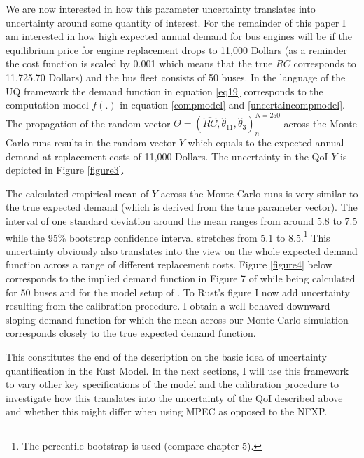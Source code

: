 We are now interested in how this parameter uncertainty translates into uncertainty around some quantity of interest. For the remainder of this paper I am interested in how high expected annual demand for bus engines will be if the equilibrium price for engine replacement drops to 11,000 Dollars (as a reminder the cost function is scaled by 0.001 which means that the true $RC$ corresponds to 11,725.70 Dollars) and the bus fleet consists of 50 buses. In the language of the UQ framework the demand function in equation \ref{eq19} corresponds to the computation model $f(.)$ in equation \ref{compmodel} and \ref{uncertaincompmodel}. The propagation of the random vector $\Theta = (\hat{RC}, \hat\theta_{11}, \hat\theta_3)^{N=250}_n$ across the Monte Carlo runs results in the random vector $Y$ which equals to the expected annual demand at replacement costs of 11,000 Dollars. The uncertainty in the QoI $Y$ is depicted in Figure \ref{figure3}.


The calculated empirical mean of $Y$ across the Monte Carlo runs is very similar to the true expected demand (which is derived from the true parameter vector). The interval of one standard deviation around the mean ranges from around 5.8 to 7.5 while the 95\% bootstrap confidence interval stretches from 5.1 to 8.5.\footnote{The percentile bootstrap is used (compare \cite{Davison.1997} chapter 5).} This uncertainty obviously also translates into the view on the whole expected demand function across a range of different replacement costs. Figure \ref{figure4} below corresponds to the implied demand function in Figure 7 of \cite{Rust.1987} while being calculated for 50 buses and for the model setup of \cite{Iskhakov.2016}. To Rust's figure I now add uncertainty resulting from the calibration procedure. I obtain a well-behaved downward sloping demand function for which the mean across our Monte Carlo simulation corresponds closely to the true expected demand function.

This constitutes the end of the description on the basic idea of uncertainty quantification in the Rust Model. In the next sections, I will use this framework to vary other key specifications of the model and the calibration procedure to investigate how this translates into the uncertainty of the QoI described above and whether this might differ when using MPEC as opposed to the NFXP.

